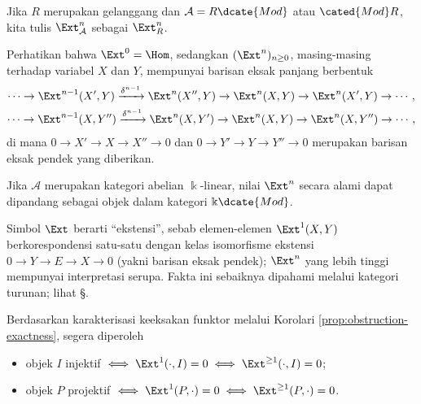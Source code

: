 Jika $R$ merupakan gelanggang dan $\mathcal{A}=R\dcate{Mod}$ atau
$\cated{Mod}R$, kita tulis $\Ext^n_{\mathcal{A}}$ sebagai $\Ext^n_R$.

Perhatikan bahwa $\Ext^0=\Hom$, sedangkan $(\Ext^n)_{n\geq0}$, masing-masing
terhadap variabel $X$ dan $Y$, mempunyai barisan eksak panjang berbentuk
\begin{gather*}
\cdots\to\Ext^{n-1}(X',Y)\xrightarrow{\delta^{n-1}}\Ext^n(X'',Y)\to
\Ext^n(X,Y)\to\Ext^n(X',Y)\to\cdots,\\
\cdots\to\Ext^{n-1}(X,Y'')\xrightarrow{\delta^{n-1}}\Ext^n(X,Y')\to
\Ext^n(X,Y)\to\Ext^n(X,Y'')\to\cdots,
\end{gather*}
di mana $0\to X'\to X\to X''\to0$ dan
$0\to Y'\to Y\to Y''\to0$ merupakan barisan eksak pendek yang diberikan.

Jika $\mathcal{A}$ merupakan kategori abelian $\Bbbk$-linear, nilai $\Ext^n$
secara alami dapat dipandang sebagai objek dalam kategori $\Bbbk\dcate{Mod}$.

\begin{catatan}
Simbol $\Ext$ berarti ``ekstensi'', sebab elemen-elemen $\Ext^1(X,Y)$
berkorespondensi satu-satu dengan kelas isomorfisme ekstensi
$0\to Y\to E\to X\to0$ (yakni barisan eksak pendek); $\Ext^n$ yang lebih
tinggi mempunyai interpretasi serupa. Fakta ini sebaiknya dipahami melalui
kategori turunan; lihat \S{}.
\end{catatan}

Berdasarkan karakterisasi keeksakan funktor melalui Korolari
\ref{prop:obstruction-exactness}, segera diperoleh

\begin{itemize}
\item objek $I$ injektif $\iff \Ext^1(\cdot,I)=0\iff
\Ext^{\geq1}(\cdot,I)=0$;
\item objek $P$ projektif $\iff \Ext^1(P,\cdot)=0\iff
\Ext^{\geq1}(P,\cdot)=0$.
\end{itemize}

